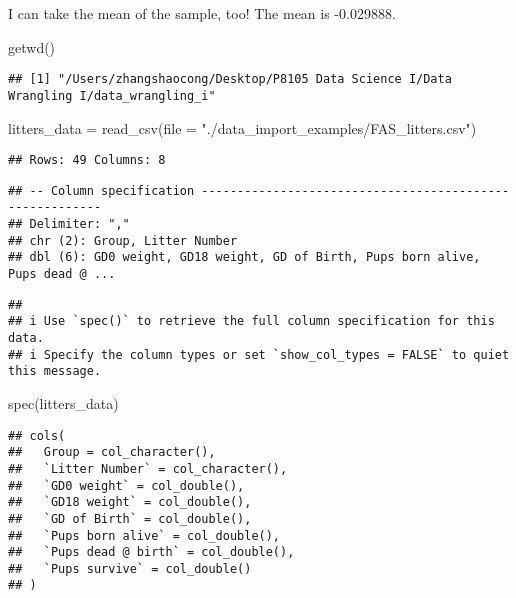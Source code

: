 \documentclass[
]{article}
\newenvironment{Shaded}{\begin{snugshade}}{\end{snugshade}}
\newcommand{\AttributeTok}[1]{\textcolor[rgb]{0.77,0.63,0.00}{#1}}
\newcommand{\FunctionTok}[1]{\textcolor[rgb]{0.00,0.00,0.00}{#1}}
\newcommand{\NormalTok}[1]{#1}
\newcommand{\OtherTok}[1]{\textcolor[rgb]{0.56,0.35,0.01}{#1}}
\newcommand{\StringTok}[1]{\textcolor[rgb]{0.31,0.60,0.02}{#1}}
\begin{document}
I can take the mean of the sample, too! The mean is -0.029888.

\begin{Shaded}
\begin{Highlighting}[]
\FunctionTok{getwd}\NormalTok{()}
\end{Highlighting}
\end{Shaded}

\begin{verbatim}
## [1] "/Users/zhangshaocong/Desktop/P8105 Data Science I/Data Wrangling I/data_wrangling_i"
\end{verbatim}

\begin{Shaded}
\begin{Highlighting}[]
\NormalTok{litters\_data }\OtherTok{=} \FunctionTok{read\_csv}\NormalTok{(}\AttributeTok{file =} \StringTok{"./data\_import\_examples/FAS\_litters.csv"}\NormalTok{)}
\end{Highlighting}
\end{Shaded}

\begin{verbatim}
## Rows: 49 Columns: 8
\end{verbatim}

\begin{verbatim}
## -- Column specification --------------------------------------------------------
## Delimiter: ","
## chr (2): Group, Litter Number
## dbl (6): GD0 weight, GD18 weight, GD of Birth, Pups born alive, Pups dead @ ...
\end{verbatim}

\begin{verbatim}
## 
## i Use `spec()` to retrieve the full column specification for this data.
## i Specify the column types or set `show_col_types = FALSE` to quiet this message.
\end{verbatim}

\begin{Shaded}
\begin{Highlighting}[]
\FunctionTok{spec}\NormalTok{(litters\_data)}
\end{Highlighting}
\end{Shaded}

\begin{verbatim}
## cols(
##   Group = col_character(),
##   `Litter Number` = col_character(),
##   `GD0 weight` = col_double(),
##   `GD18 weight` = col_double(),
##   `GD of Birth` = col_double(),
##   `Pups born alive` = col_double(),
##   `Pups dead @ birth` = col_double(),
##   `Pups survive` = col_double()
## )
\end{verbatim}
\end{document}
